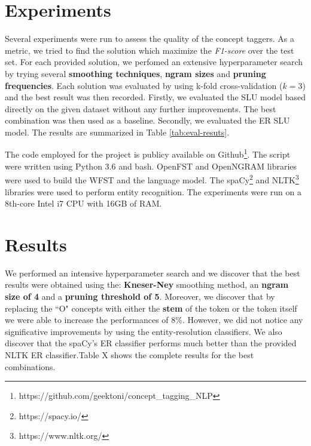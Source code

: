 \documentclass[11pt,a4paper]{article}
\begin{document}
\section{Experiments}

Several experiments were run to assess the quality of 
the concept taggers. As a metric, we tried to find the solution which maximize the \textit{F1-score} over the test set. For each provided solution, we perfomed an extensive hyperparameter search by trying several \textbf{smoothing techniques}, \textbf{ngram sizes} and \textbf{pruning frequencies}. Each solution was evaluated by using k-fold cross-validation ($k=3$) and the best result was then recorded. Firstly, we evaluated the SLU model based directly on the given dataset without any further improvements. The best combination was then used as a baseline. Secondly, we evaluated the ER SLU model. The results are summarized in Table \ref{tab:eval-resuts}.

The code employed for the project is publicy available on Github\footnote{https://github.com/geektoni/concept\_tagging\_NLP}. The script were written using Python 3.6 and bash. OpenFST \cite{openfst} and OpenNGRAM \cite{opengrm} libraries were used to build the WFST and the language model. The spaCy\footnote{https://spacy.io/} and NLTK\footnote{https://www.nltk.org/} libraries were used to perform entity recognition.
The experiments were run on a 8th-core Intel i7 CPU with 16GB of RAM. 



\section{Results}

We performed an intensive hyperparameter search and we discover that the best results were obtained using the: \textbf{Kneser-Ney} smoothing method, an \textbf{ngram size of 4} and a \textbf{pruning threshold of 5}. Moreover, we discover that by replacing the ``O" concepts with either the \textbf{stem} of the token or the token itself we were able to increase the performances of 8\%.
However, we did not notice any significative improvements by using the entity-resolution classifiers. We also discover that the spaCy's ER classifier performs much better than the provided NLTK ER classifier.Table X shows the complete results for the best combinations.
\end{document}
